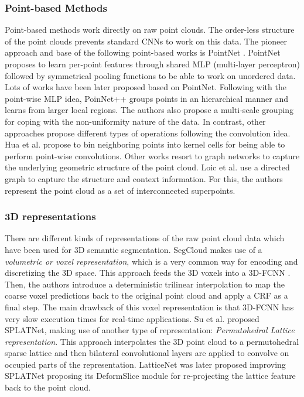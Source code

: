 \documentclass[letterpaper, 10 pt, journal, twoside]{IEEEtran}
\begin{document}
\subsubsection{Point-based Methods}
Point-based methods work directly on raw point clouds. The order-less structure of the point clouds prevents standard CNNs to work on this data. 
The pioneer approach and base of the following point-based works is PointNet \cite{qi2017pointnet}. PointNet proposes to learn per-point features through shared MLP (multi-layer perceptron) followed by symmetrical pooling functions to be able to work on unordered data.
Lots of works have been later proposed based on PointNet.
Following with the point-wise MLP idea, PoinNet++ \cite{qi2017pointnet++} groups points in an hierarchical manner and learns from larger local regions. The authors also propose a multi-scale grouping for coping with the non-uniformity nature of the data.
In contrast, other approaches propose different types of operations following the convolution idea. Hua et al.\cite{hua2018pointwise} propose to bin neighboring points into kernel cells for being able to perform point-wise convolutions.
Other works resort to graph networks to capture the underlying geometric structure of the point cloud. Loic et al. \cite{landrieu2018large} use a directed graph to capture the structure and context information. For this, the authors represent the point cloud as a set of interconnected superpoints.
 

\subsubsection{3D representations}
There are different kinds of representations of the raw point cloud data which have been used for 3D semantic segmentation. SegCloud \cite{tchapmi2017segcloud} makes use of a \textit{volumetric or voxel representation}, which is a very common way for encoding and discretizing the 3D space.  This approach feeds the 3D voxels into a 3D-FCNN \cite{long2015fully}. Then, the authors introduce a deterministic trilinear interpolation to map the coarse voxel predictions back to the original point cloud and apply a CRF as a final step. The main drawback of this voxel representation is that 3D-FCNN has very slow execution times for real-time applications.
Su et al. \cite{su2018splatnet} proposed SPLATNet, making use of another type of representation: \textit{Permutohedral Lattice representation}. This approach interpolates the 3D point cloud to a permutohedral sparse lattice and then bilateral convolutional layers are applied to convolve on occupied parts of the representation. LatticeNet \cite{rosu2019latticenet} was later proposed improving SPLATNet proposing its DeformSlice module for re-projecting the lattice feature back to the point cloud.
\end{document}
